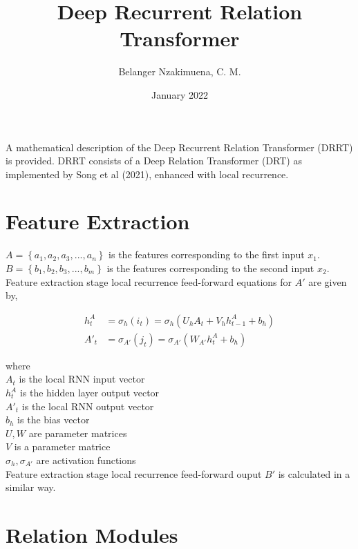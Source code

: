 \documentclass{article}
\title{Deep Recurrent Relation Transformer}
\author{Belanger Nzakimuena, C. M.}
\date{January 2022}
\begin{document}
\maketitle

\noindent A mathematical description of the Deep Recurrent Relation Transformer (DRRT) is provided.  DRRT consists of a Deep Relation Transformer (DRT) as implemented by Song et al (2021), enhanced with local recurrence.

\section{Feature Extraction}

\noindent $A = \left\{a_{1}, a_{2}, a_{3}, ..., a_{n}\right\}$ is the features corresponding to the first input $x_{1}$. \\
\noindent $B = \left\{b_{1}, b_{2}, b_{3}, ..., b_{m}\right\}$ is the features corresponding to the second input $x_{2}$. \\

\noindent Feature extraction stage local recurrence feed-forward equations for $A'$ are given by,

\begin{align}
h_{t}^{A} &= \sigma_{h}(i_{t}) = \sigma_{h}(U_{h}A_{t}+V_{h}h_{t-1}^{A}+b_{h}) \\
A'_{t} &= \sigma_{A'}(j_{t}) = \sigma_{A'}(W_{A'}h_{t}^{A}+b_{h})
\end{align}

where \\

\indent\indent $A_{t}$ is the local RNN input vector \\
\indent\indent $h_{t}^{A}$ is the hidden layer output vector \\
\indent\indent $A'_{t}$ is the local RNN output vector \\
\indent\indent $b_{h}$ is the bias vector \\
\indent\indent $U, W$ are parameter matrices \\
\indent\indent $V$ is a parameter matrice \\
\indent\indent $\sigma_{h}, \sigma_{A'}$ are activation functions \\

\noindent Feature extraction stage local recurrence feed-forward ouput $B'$ is calculated in a similar way.

\section{Relation Modules}
\end{document}
